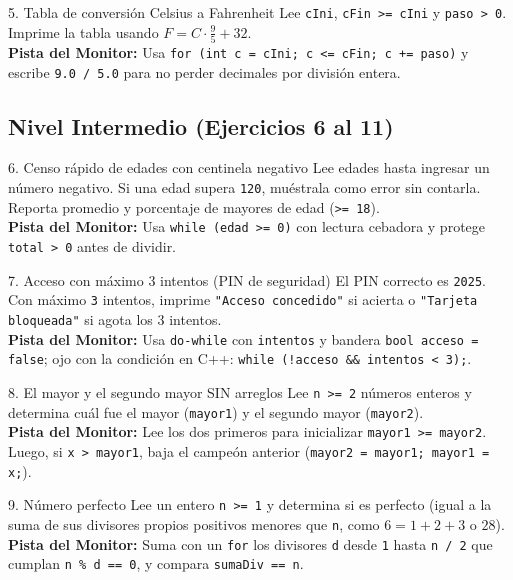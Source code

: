 \documentclass[11pt,letterpaper]{article}
\begin{document}
\begin{ejercicio}{5. Tabla de conversión Celsius a Fahrenheit}
Lee \texttt{cIni}, \texttt{cFin >= cIni} y \texttt{paso > 0}. Imprime la tabla usando $F = C \cdot \frac{9}{5} + 32$.\\
\textbf{Pista del Monitor:} Usa \texttt{for (int c = cIni; c <= cFin; c += paso)} y escribe \texttt{9.0 / 5.0} para no perder decimales por división entera.
\end{ejercicio}

\subsection{Nivel Intermedio (Ejercicios 6 al 11)}

\begin{ejercicio}{6. Censo rápido de edades con centinela negativo}
Lee edades hasta ingresar un número negativo. Si una edad supera \texttt{120}, muéstrala como error sin contarla. Reporta promedio y porcentaje de mayores de edad (\texttt{>= 18}).\\
\textbf{Pista del Monitor:} Usa \texttt{while (edad >= 0)} con lectura cebadora y protege \texttt{total > 0} antes de dividir.
\end{ejercicio}

\begin{ejercicio}{7. Acceso con máximo 3 intentos (PIN de seguridad)}
El PIN correcto es \texttt{2025}. Con máximo \texttt{3} intentos, imprime \texttt{"Acceso concedido"} si acierta o \texttt{"Tarjeta bloqueada"} si agota los 3 intentos.\\
\textbf{Pista del Monitor:} Usa \texttt{do-while} con \texttt{intentos} y bandera \texttt{bool acceso = false}; ojo con la condición en C++: \texttt{while (!acceso \&\& intentos < 3);}.
\end{ejercicio}

\begin{ejercicio}{8. El mayor y el segundo mayor SIN arreglos}
Lee \texttt{n >= 2} números enteros y determina cuál fue el mayor (\texttt{mayor1}) y el segundo mayor (\texttt{mayor2}).\\
\textbf{Pista del Monitor:} Lee los dos primeros para inicializar \texttt{mayor1 >= mayor2}. Luego, si \texttt{x > mayor1}, baja el campeón anterior (\texttt{mayor2 = mayor1; mayor1 = x;}).
\end{ejercicio}

\begin{ejercicio}{9. Número perfecto}
Lee un entero \texttt{n >= 1} y determina si es perfecto (igual a la suma de sus divisores propios positivos menores que \texttt{n}, como $6 = 1 + 2 + 3$ o $28$).\\
\textbf{Pista del Monitor:} Suma con un \texttt{for} los divisores \texttt{d} desde \texttt{1} hasta \texttt{n / 2} que cumplan \texttt{n \% d == 0}, y compara \texttt{sumaDiv == n}.
\end{ejercicio}
\end{document}
